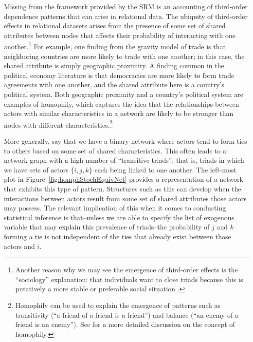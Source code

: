 Missing from the framework provided by the SRM is an accounting of third-order dependence patterns that can arise in relational data. The ubiquity of third-order effects in relational datasets arises from the presence of some set of shared attributes between nodes that affects their probability of interacting with one another.\footnote{Another reason why we may see the emergence of third-order effects is the ``sociology'' explanation: that individuals want to close triads because  this is putatively a more stable or preferable social situation \citep{wasserman:faust:1994}.} For example, one finding from the gravity model of trade is that neighboring countries are more likely to trade with one another; in this case, the shared attribute is simply geographic proximity. A finding common in the political economy literature is that democracies are more likely to form trade agreements with one another, and the shared attribute here is a country's political system. Both geographic proximity and a country's political system are examples of homophily, which captures the idea that the relationships between actors with similar characteristics in a network are likely to be stronger than nodes with different characteristics.\footnote{Homophily can be used to explain the emergence of patterns such as transitivity (``a friend of a friend is a friend'') and balance (``an enemy of a friend is an enemy''). See \citet{shalizi:thomas:2011} for a more detailed discussion on the concept of homophily.} 

More generally, say that we have a binary network where actors tend to form ties to others based on some set of shared characteristics. This often leads to a network graph with a high number of ``transitive triads'', that is, triads in which we have sets of actors $\{i,j,k\}$ each being linked to one another. The left-most plot in Figure~\ref{fig:homphStochEquivNet} provides a representation of a network that exhibits this type of pattern. Structures such as this can develop when the interactions between actors result from some set of shared attributes those actors may possess. The relevant implication of this when it comes to conducting statistical inference is that--unless we are able to specify the list of exogenous variable that may explain this prevalence of triads--the probability of $j$ and $k$ forming a tie is not independent of the ties that already exist between those actors and $i$. 


